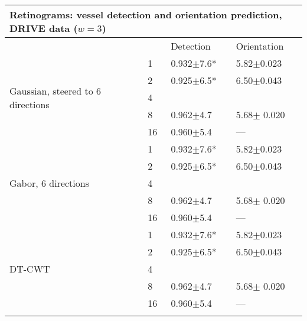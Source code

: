 \begin{tabularx}{\columnwidth}{X X X X}
\toprule
\multicolumn{4}{p{\columnwidth}}{ Retinograms: vessel detection and orientation prediction, 
\newline DRIVE data ($w = 3$)} \\
\midrule
        &       & Detection         & Orientation \\
\midrule
\multirow{5}{2cm}{Gaussian, steered to 6 directions}
        & 1     & 0.932$\pm$7.6*    & 5.82$\pm$0.023 \\
        & 2     & 0.925$\pm$6.5*    & 6.50$\pm$0.043 \\
        & 4     &                   &  \\
        & 8     & 0.962$\pm$4.7     & 5.68$\pm$ 0.020 \\
        & 16    & 0.960$\pm$5.4     & --- \\

\midrule
\multirow{5}{2cm}{Gabor, 6 directions}
        & 1     & 0.932$\pm$7.6*    & 5.82$\pm$0.023 \\
        & 2     & 0.925$\pm$6.5*    & 6.50$\pm$0.043 \\
        & 4     &                   &  \\
        & 8     & 0.962$\pm$4.7     & 5.68$\pm$ 0.020 \\
        & 16    & 0.960$\pm$5.4     & --- \\
\midrule
\multirow{5}{2cm}{DT-CWT}
        & 1     & 0.932$\pm$7.6*    & 5.82$\pm$0.023 \\
        & 2     & 0.925$\pm$6.5*    & 6.50$\pm$0.043 \\
        & 4     &                   &  \\
        & 8     & 0.962$\pm$4.7     & 5.68$\pm$ 0.020 \\
        & 16    & 0.960$\pm$5.4     & --- \\


\bottomrule
\noalign{\smallskip}
\end{tabularx} 